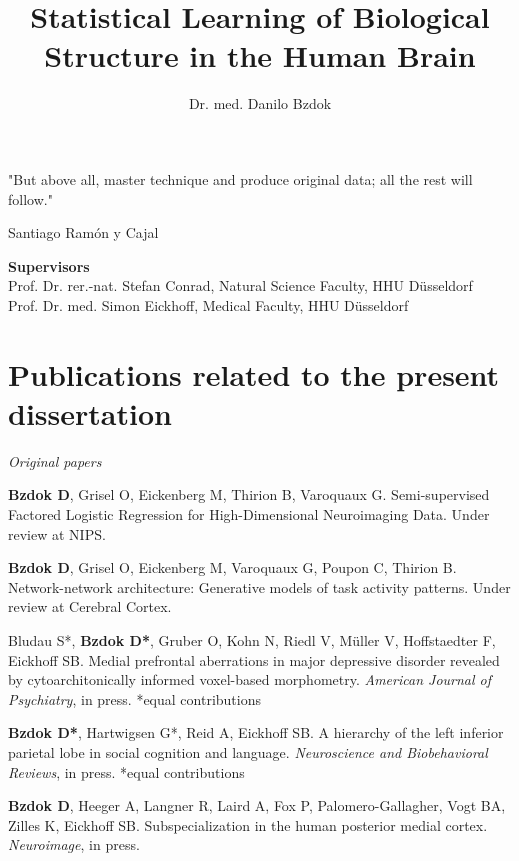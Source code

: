 \documentclass[authoryear,review,3p]{elsarticle}
\begin{document}
  
\begin{frontmatter}

\title{Statistical Learning of Biological Structure in the Human Brain}

\author{Dr. med. Danilo Bzdok}

\end{frontmatter}

\bigskip
\bigskip
\bigskip
\centerline{
"But above all, master technique and produce original data; 
all the rest will follow."}
\centerline{Santiago Ram\'{o}n y Cajal}

\bigskip
\bigskip
\bigskip

\textbf{Supervisors\\}
Prof. Dr. rer.-nat. Stefan Conrad, Natural Science Faculty, HHU Düsseldorf\\
Prof. Dr. med. Simon Eickhoff, Medical Faculty, HHU Düsseldorf


\bigskip

\newpage
\section*{Publications related to the present dissertation}
\linebreak
\textit{Original papers}

\textbf{Bzdok D}, Grisel O, Eickenberg M, Thirion B, Varoquaux G.
Semi-supervised Factored Logistic Regression for High-Dimensional
Neuroimaging Data. Under review at NIPS.

\textbf{Bzdok D}, Grisel O, Eickenberg M, Varoquaux G, Poupon C, Thirion B.
Network-network architecture: Generative models of task activity patterns.
Under review at Cerebral Cortex.

Bludau S*, \textbf{Bzdok D*}, Gruber O,
Kohn N, Riedl V, Müller V, Hoffstaedter F, Eickhoff SB.
Medial prefrontal aberrations in major depressive disorder
revealed by cytoarchitonically informed voxel-based morphometry.
\textit{American Journal of Psychiatry}, in press. *equal contributions

\textbf{Bzdok D*}, Hartwigsen G*, Reid A, Eickhoff SB.
A hierarchy of the left inferior parietal lobe in social cognition and
language.
\textit{Neuroscience and Biobehavioral Reviews}, in press. *equal contributions

\textbf{Bzdok D}, Heeger A, Langner R, Laird A, Fox P, Palomero-Gallagher,
Vogt BA, Zilles K, Eickhoff SB.
Subspecialization in the human posterior medial cortex.
\textit{Neuroimage}, in press.
\end{document}
